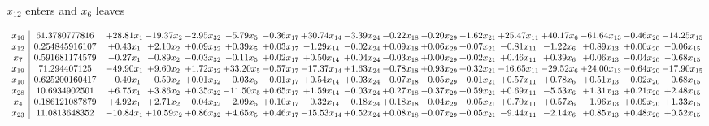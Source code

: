 \documentclass[9pt]{article}
\begin{document}
 $ x_{12} $ enters and $ x_{6} $ leaves 

 \[\begin{array}{c| c c@{\hskip 2pt} c@{\hskip 2pt} c@{\hskip 2pt} c@{\hskip 2pt} c@{\hskip 2pt} c@{\hskip 2pt} c@{\hskip 2pt} c@{\hskip 2pt} c@{\hskip 2pt} c@{\hskip 2pt} c@{\hskip 2pt} c@{\hskip 2pt} c@{\hskip 2pt} c@{\hskip 2pt} c@{\hskip 2pt} }
 x_{16}   &  61.3780777816 & + 28.81 x_{1} & -19.37 x_{2} & -2.95 x_{32} & -5.79 x_{5} & -0.36 x_{17} & + 30.74 x_{14} & -3.39 x_{24} & -0.22 x_{18} & -0.20 x_{29} & -1.62 x_{21} & + 25.47 x_{11} & + 40.17 x_{6} & -61.64 x_{13} & -0.46 x_{20} & -14.25 x_{15}\\
 x_{12}   &  0.254845916107 & +  0.43 x_{1} & +  2.10 x_{2} & +  0.09 x_{32} & +  0.39 x_{5} & +  0.03 x_{17} & -1.29 x_{14} & -0.02 x_{24} & +  0.09 x_{18} & +  0.06 x_{29} & +  0.07 x_{21} & -0.81 x_{11} & -1.22 x_{6} & +  0.89 x_{13} & +  0.00 x_{20} & -0.06 x_{15}\\
 x_{7}   &  0.591681174579 & -0.27 x_{1} & -0.89 x_{2} & -0.03 x_{32} & -0.11 x_{5} & +  0.02 x_{17} & +  0.50 x_{14} & +  0.04 x_{24} & -0.03 x_{18} & +  0.00 x_{29} & +  0.02 x_{21} & +  0.46 x_{11} & +  0.39 x_{6} & +  0.06 x_{13} & -0.04 x_{20} & -0.68 x_{15}\\
 x_{19}   &  71.294407125 & -49.90 x_{1} & +  9.60 x_{2} & +  1.72 x_{32} & + 33.20 x_{5} & -0.57 x_{17} & -17.37 x_{14} & +  1.63 x_{24} & -0.78 x_{18} & +  0.93 x_{29} & +  0.32 x_{21} & -16.65 x_{11} & -29.52 x_{6} & + 24.00 x_{13} & -0.64 x_{20} & -17.90 x_{15}\\
 x_{10}   &  0.625200160417 & -0.40 x_{1} & -0.59 x_{2} & +  0.01 x_{32} & -0.03 x_{5} & -0.01 x_{17} & +  0.54 x_{14} & +  0.03 x_{24} & -0.07 x_{18} & -0.05 x_{29} & +  0.01 x_{21} & +  0.57 x_{11} & +  0.78 x_{6} & +  0.51 x_{13} & -0.02 x_{20} & -0.68 x_{15}\\
 x_{28}   &  10.6934902501 & +  6.75 x_{1} & +  3.86 x_{2} & +  0.35 x_{32} & -11.50 x_{5} & +  0.65 x_{17} & +  1.59 x_{14} & -0.03 x_{24} & +  0.27 x_{18} & -0.37 x_{29} & +  0.59 x_{21} & +  0.69 x_{11} & -5.53 x_{6} & +  1.31 x_{13} & +  0.21 x_{20} & +  2.48 x_{15}\\
 x_{4}   &  0.186121087879 & +  4.92 x_{1} & +  2.71 x_{2} & -0.04 x_{32} & -2.09 x_{5} & +  0.10 x_{17} & -0.32 x_{14} & -0.18 x_{24} & +  0.18 x_{18} & -0.04 x_{29} & +  0.05 x_{21} & +  0.70 x_{11} & +  0.57 x_{6} & -1.96 x_{13} & +  0.09 x_{20} & +  1.33 x_{15}\\
 x_{23}   &  11.0813648352 & -10.84 x_{1} & + 10.59 x_{2} & +  0.86 x_{32} & +  4.65 x_{5} & +  0.46 x_{17} & -15.53 x_{14} & +  0.52 x_{24} & +  0.08 x_{18} & -0.07 x_{29} & +  0.05 x_{21} & -9.44 x_{11} & -2.14 x_{6} & +  0.85 x_{13} & +  0.48 x_{20} & +  0.52 x_{15}\\

\end{array}\]
\end{document}
